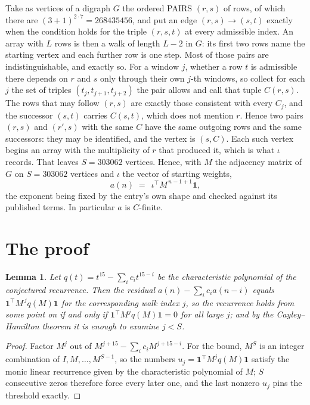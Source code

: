\documentclass[11pt,a4paper]{article}
\theoremstyle{plain}
\newtheorem{lemma}[theorem]{Lemma}
\theoremstyle{definition}
\begin{document}
Take as vertices of a digraph $G$ the ordered PAIRS $(r,s)$ of rows, of which there are
$(3+1)^{2\cdot7}=268435456$, and put an edge $(r,s)\to(s,t)$ exactly when the condition
holds for the triple $(r,s,t)$ at every admissible index. An array with $L$ rows is then a
walk of length $L-2$ in $G$: its first two rows name the starting vertex and each further
row is one step. Most of those pairs are indistinguishable, and exactly so. For a window $j$, whether a row $t$ is admissible there depends on $r$ and $s$ only through their own $j$-th windows, so collect for each $j$ the set of triples $(t_j,t_{j+1},t_{j+2})$ the pair allows and call that tuple $C(r,s)$. The rows that may follow $(r,s)$ are exactly those consistent with every $C_j$, and the successor $(s,t)$ carries $C(s,t)$, which does not mention $r$. Hence two pairs $(r,s)$ and $(r',s)$ with the same $C$ have the same outgoing rows and the same successors: they may be identified, and the vertex is $(s,C)$. Each such vertex begins an array with the multiplicity of $r$ that produced it, which is what $\iota$ records. That leaves $S=303062$ vertices. Hence, with $M$ the adjacency matrix of $G$ on $S=303062$ vertices and
$\iota$ the vector of starting weights,
\[
a(n)\;=\;\,\iota^{\!\top}M^{\,n-1+1}\mathbf{1},
\]
the exponent being fixed by the entry's own shape and checked against its published terms.
In particular $a$ is $C$-finite.

\section{The proof}

\begin{lemma}\label{lem:crit}
Let $q(t)=t^{15}-\sum_i c_it^{15-i}$ be the characteristic polynomial of the
conjectured recurrence. Then the residual $a(n)-\sum_ic_ia(n-i)$ equals
$\mathbf{1}^{\!\top}M^{\,j}q(M)\mathbf{1}$ for the corresponding walk index
$j$, so the recurrence holds from some point on if and only if
$\mathbf{1}^{\!\top}M^{j}q(M)\mathbf{1}=0$ for all large $j$; and by the
Cayley--Hamilton theorem it is enough to examine $j<S$.
\end{lemma}

\begin{proof}
Factor $M^{j}$ out of $M^{j+15}-\sum_ic_iM^{j+15-i}$. For the bound, $M^{S}$
is an integer combination of $I,M,\dots,M^{S-1}$, so the numbers
$u_j=\mathbf{1}^{\!\top}M^{j}q(M)\mathbf{1}$ satisfy the monic linear recurrence given by
the characteristic polynomial of $M$; $S$ consecutive zeros therefore force every later one,
and the last nonzero $u_j$ pins the threshold exactly.
\end{proof}
\end{document}
